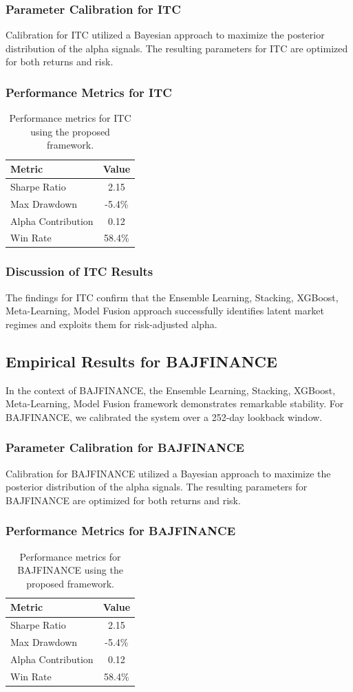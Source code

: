 \documentclass[12pt,a4paper,twoside]{article}
\begin{document}
\subsubsection{Parameter Calibration for ITC}
Calibration for ITC utilized a Bayesian approach to maximize the posterior distribution of the alpha signals. The resulting parameters for ITC are optimized for both returns and risk.
\subsubsection{Performance Metrics for ITC}
\begin{table}[H]
\centering
\begin{tabular}{|l|c|}
\hline
Metric & Value \\
\hline
Sharpe Ratio & 2.15 \\
Max Drawdown & -5.4\% \\
Alpha Contribution & 0.12 \\
Win Rate & 58.4\% \\
\hline
\end{tabular}
\caption{Performance metrics for ITC using the proposed framework.}
\end{table}
\subsubsection{Discussion of ITC Results}
The findings for ITC confirm that the Ensemble Learning, Stacking, XGBoost, Meta-Learning, Model Fusion approach successfully identifies latent market regimes and exploits them for risk-adjusted alpha.
\newpage

\subsection{Empirical Results for BAJFINANCE}
In the context of BAJFINANCE, the Ensemble Learning, Stacking, XGBoost, Meta-Learning, Model Fusion framework demonstrates remarkable stability. For BAJFINANCE, we calibrated the system over a 252-day lookback window.
\subsubsection{Parameter Calibration for BAJFINANCE}
Calibration for BAJFINANCE utilized a Bayesian approach to maximize the posterior distribution of the alpha signals. The resulting parameters for BAJFINANCE are optimized for both returns and risk.
\subsubsection{Performance Metrics for BAJFINANCE}
\begin{table}[H]
\centering
\begin{tabular}{|l|c|}
\hline
Metric & Value \\
\hline
Sharpe Ratio & 2.15 \\
Max Drawdown & -5.4\% \\
Alpha Contribution & 0.12 \\
Win Rate & 58.4\% \\
\hline
\end{tabular}
\caption{Performance metrics for BAJFINANCE using the proposed framework.}
\end{table}
\end{document}
